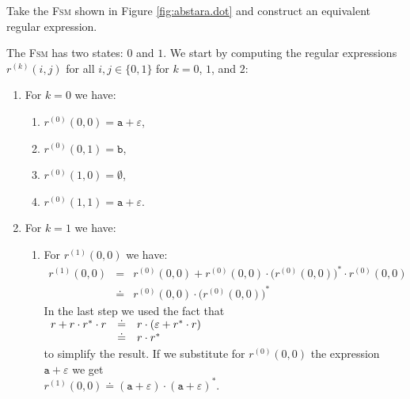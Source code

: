 \exerciseEng
Take the \textsc{Fsm} shown in Figure \ref{fig:abstara.dot} and construct an equivalent regular expression.


\solutionEng
The \textsc{Fsm} has two states: $0$ and $1$.  We start by computing the regular expressions
$r^{(k)}(i,j)$ for all $i,j\in\{0,1\}$ for  $k =0$, $1$, and $2$:
\begin{enumerate}
\item For $k = 0$ we have:
      \begin{enumerate}
      \item $r^{(0)}(0, 0) = \texttt{a} + \varepsilon$,
      \item $r^{(0)}(0, 1) = \texttt{b}$,
      \item $r^{(0)}(1, 0) = \emptyset$,
      \item $r^{(0)}(1, 1) = \texttt{a} + \varepsilon$.
      \end{enumerate}
\item For $k=1$ we have:
      \begin{enumerate}
      \item For $r^{(1)}(0, 0)$ we have:
            \begin{eqnarray*}
                  r^{(1)}(0, 0) 
            & = & r^{(0)}(0, 0) + 
                  r^{(0)}(0, 0) \cdot \bigl(r^{(0)}(0, 0)\bigr)^* \cdot r^{(0)}(0, 0) \\
            & \doteq & r^{(0)}(0, 0) \cdot \bigl(r^{(0)}(0, 0)\bigr)^*
            \end{eqnarray*}
             In the last step we used the fact that 
             \\[0.2cm]
             \hspace*{1.3cm}
             $
             \begin{array}[t]{lcl}
               r + r \cdot r^* \cdot r & \doteq & r \cdot (\varepsilon + r^* \cdot r) \\
                                       & \doteq & r \cdot r^*
             \end{array}
             $
             \\[0.2cm]
             to simplify the result.
             If we substitute for $r^{(0)}(0, 0)$ the expression $\texttt{a} + \varepsilon$  
             we get 
             \\[0.2cm]
             \hspace*{1.3cm}
             $r^{(1)}(0, 0) \doteq (\texttt{a} + \varepsilon)\cdot (\texttt{a} + \varepsilon)^*$.
             \\[0.2cm]

\end{enumerate}
\end{enumerate}
